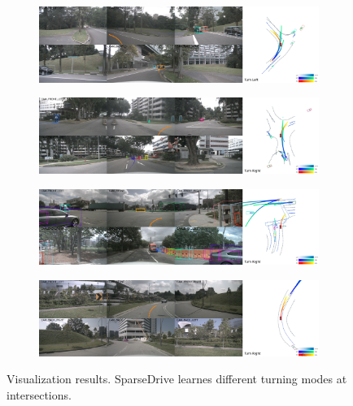 \begin{figure}[htbp]
  \centering
  \begin{subfigure}{0.8\linewidth}
  \centering
  \includegraphics[width=1.0\linewidth]{Figures/vis/turn1.jpg}
  \end{subfigure}
  \begin{subfigure}{0.8\linewidth}
  \centering
  \includegraphics[width=1.0\linewidth]{Figures/vis/turn2.jpg}
  \end{subfigure}
  \begin{subfigure}{0.8\linewidth}
  \centering
  \includegraphics[width=1.0\linewidth]{Figures/vis/turn3.jpg}
  \end{subfigure}
  \begin{subfigure}{0.8\linewidth}
  \centering
  \includegraphics[width=1.0\linewidth]{Figures/vis/turn4.jpg}
  \end{subfigure}
  \caption{Visualization results. SparseDrive learnes different turning modes at intersections.}
  \label{fig:vis}
\end{figure}